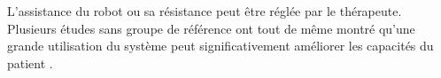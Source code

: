 		L'assistance du robot ou sa résistance peut être réglée par le thérapeute.
		Plusieurs études sans groupe de référence ont tout de même montré qu'une grande utilisation du système peut significativement améliorer les capacités du patient \cite{Nef_EffectsArmTraining, Staubli_EffectsIntensiveArmTraining}.


















